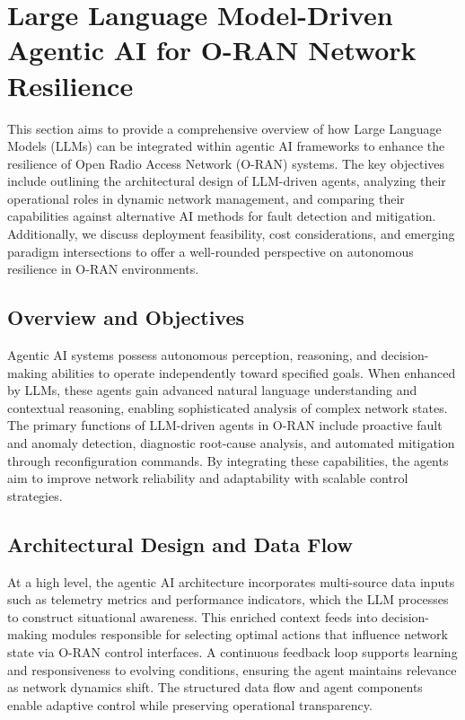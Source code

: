 \documentclass[sigconf]{acmart}
\begin{document}
\section{Large Language Model-Driven Agentic AI for O-RAN Network Resilience}

This section aims to provide a comprehensive overview of how Large Language Models (LLMs) can be integrated within agentic AI frameworks to enhance the resilience of Open Radio Access Network (O-RAN) systems. The key objectives include outlining the architectural design of LLM-driven agents, analyzing their operational roles in dynamic network management, and comparing their capabilities against alternative AI methods for fault detection and mitigation. Additionally, we discuss deployment feasibility, cost considerations, and emerging paradigm intersections to offer a well-rounded perspective on autonomous resilience in O-RAN environments.

\subsection{Overview and Objectives}
Agentic AI systems possess autonomous perception, reasoning, and decision-making abilities to operate independently toward specified goals. When enhanced by LLMs, these agents gain advanced natural language understanding and contextual reasoning, enabling sophisticated analysis of complex network states. The primary functions of LLM-driven agents in O-RAN include proactive fault and anomaly detection, diagnostic root-cause analysis, and automated mitigation through reconfiguration commands. By integrating these capabilities, the agents aim to improve network reliability and adaptability with scalable control strategies.

\subsection{Architectural Design and Data Flow}
At a high level, the agentic AI architecture incorporates multi-source data inputs such as telemetry metrics and performance indicators, which the LLM processes to construct situational awareness. This enriched context feeds into decision-making modules responsible for selecting optimal actions that influence network state via O-RAN control interfaces. A continuous feedback loop supports learning and responsiveness to evolving conditions, ensuring the agent maintains relevance as network dynamics shift. The structured data flow and agent components enable adaptive control while preserving operational transparency.
\end{document}
